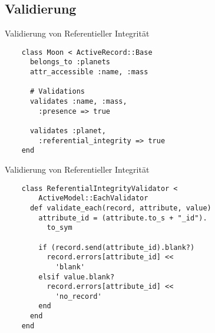 \subsection{Validierung}

\begin{frame}[fragile]{Validierung von Referentieller Integrität}
  \begin{lstlisting}
    class Moon < ActiveRecord::Base
      belongs_to :planets
      attr_accessible :name, :mass

      # Validations
      validates :name, :mass, 
        :presence => true
      
      validates :planet, 
        :referential_integrity => true
    end
  \end{lstlisting}
\end{frame}

\begin{frame}[fragile]{Validierung von Referentieller Integrität}
  \begin{lstlisting}
    class ReferentialIntegrityValidator < 
        ActiveModel::EachValidator
      def validate_each(record, attribute, value)
        attribute_id = (attribute.to_s + "_id").
          to_sym

        if (record.send(attribute_id).blank?)
          record.errors[attribute_id] << 
            'blank'
        elsif value.blank?
          record.errors[attribute_id] << 
            'no_record'
        end
      end
    end
  \end{lstlisting}
\end{frame}

